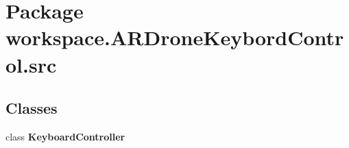 \hypertarget{namespaceworkspace_1_1_a_r_drone_keybord_control_1_1src}{}\section{Package workspace.\+A\+R\+Drone\+Keybord\+Control.\+src}
\label{namespaceworkspace_1_1_a_r_drone_keybord_control_1_1src}
\subsection*{Classes}
\begin{DoxyCompactItemize}
\item 
class {\bfseries Keyboard\+Controller}
\end{DoxyCompactItemize}
